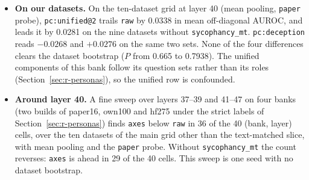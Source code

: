 \begin{itemize}
\item \textbf{On our datasets.} On the ten-dataset grid at layer 40 (mean pooling, \texttt{paper} probe), \texttt{pc:unified@2} trails \texttt{raw} by 0.0338 in mean off-diagonal AUROC, and leads it by 0.0281 on the nine datasets without \texttt{sycophancy\_mt}. %
\texttt{pc:deception} reads $-0.0268$ and $+0.0276$ on the same two sets. %
None of the four differences clears the dataset bootstrap ($P$ from 0.665 to 0.7938). %
The unified components of this bank follow its question sets rather than its roles (Section~\ref{sec:r-personas}), so the unified row is confounded.
\item \textbf{Around layer 40.} A fine sweep over layers 37--39 and 41--47 on four banks (two builds of paper16, own100 and hf275 under the strict labels of Section~\ref{sec:r-personas}) finds \texttt{axes} below \texttt{raw} in 36 of the 40 (bank, layer) cells, over the ten datasets of the main grid other than the text-matched slice, with mean pooling and the \texttt{paper} probe. %
Without \texttt{sycophancy\_mt} the count reverses: \texttt{axes} is ahead in 29 of the 40 cells. %
This sweep is one seed with no dataset bootstrap. %
\end{itemize}

